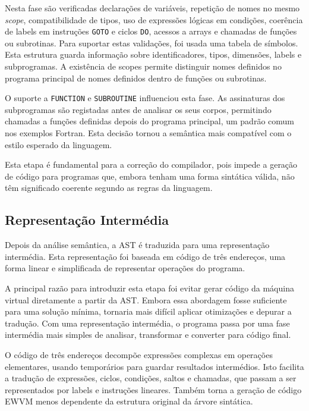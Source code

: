 \documentclass[11pt,a4paper]{report}
\begin{document}
Nesta fase são verificadas declarações de variáveis, repetição de nomes no mesmo \textit{scope}, compatibilidade de tipos, uso de expressões lógicas em condições, coerência de labels em instruções \texttt{GOTO} e ciclos \texttt{DO}, acessos a arrays e chamadas de funções ou subrotinas. Para suportar estas validações, foi usada uma tabela de símbolos. Esta estrutura guarda informação sobre identificadores, tipos, dimensões, labels e subprogramas. A existência de scopes permite distinguir nomes definidos no programa principal de nomes definidos dentro de funções ou subrotinas.

O suporte a \texttt{FUNCTION} e \texttt{SUBROUTINE} influenciou esta fase. As assinaturas dos subprogramas são registadas antes de analisar os seus corpos, permitindo chamadas a funções definidas depois do programa principal, um padrão comum nos exemplos Fortran. Esta decisão tornou a semântica mais compatível com o estilo esperado da linguagem.

Esta etapa é fundamental para a correção do compilador, pois impede a geração de código para programas que, embora tenham uma forma sintática válida, não têm significado coerente segundo as regras da linguagem.


\subsection{Representação Intermédia}

Depois da análise semântica, a AST é traduzida para uma representação intermédia. Esta representação foi baseada em código de três endereços, uma forma linear e simplificada de representar operações do programa.

A principal razão para introduzir esta etapa foi evitar gerar código da máquina virtual diretamente a partir da AST. Embora essa abordagem fosse suficiente para uma solução mínima, tornaria mais difícil aplicar otimizações e depurar a tradução. Com uma representação intermédia, o programa passa por uma fase intermédia mais simples de analisar, transformar e converter para código final.

O código de três endereços decompõe expressões complexas em operações elementares, usando temporários para guardar resultados intermédios. Isto facilita a tradução de expressões, ciclos, condições, saltos e chamadas, que passam a ser representados por labels e instruções lineares. Também torna a geração de código EWVM menos dependente da estrutura original da árvore sintática.
\end{document}
